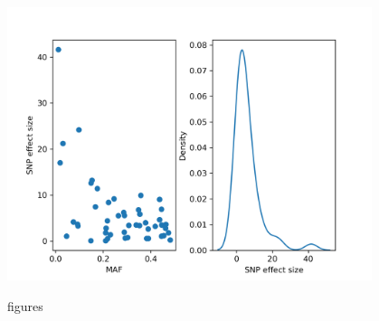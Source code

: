 \documentclass[sn-nature]{sn-jnl}%
\begin{document}
\begin{figure}
  \begin{center}
    \includegraphics[width=0.95\textwidth]{figures/SNP_effects.png} \\ 
  \end{center}
  \caption{figures}
  \label{fig:all_figures}
\end{figure}
\end{document}
